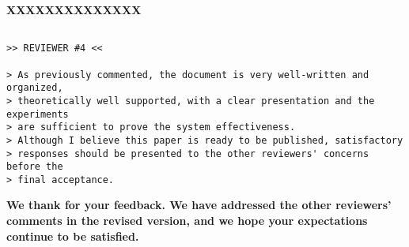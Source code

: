 \documentclass{article}
\begin{document}
\textbf{XXXXXXXXXXXXXX}

\begin{verbatim}

>> REVIEWER #4 <<

> As previously commented, the document is very well-written and organized,
> theoretically well supported, with a clear presentation and the experiments
> are sufficient to prove the system effectiveness.
> Although I believe this paper is ready to be published, satisfactory
> responses should be presented to the other reviewers' concerns before the
> final acceptance.

\end{verbatim}

\textbf{We thank for your feedback. We have addressed the other reviewers' comments in the revised version, and we hope your expectations continue to be satisfied.}
\end{document}
